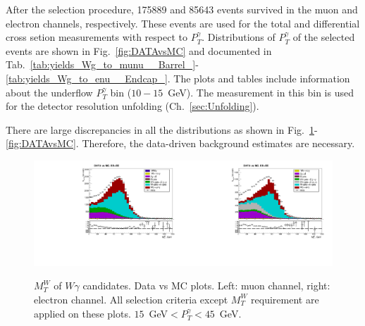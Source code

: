 
After the selection procedure, 175889 and 85643 events survived in the muon and electron channels, respectively. These events are used for the total and differential cross setion measurements with respect to $P_T^{\gamma}$. Distributions of $P_T^{\gamma}$ of the selected events are shown in Fig.~\ref{fig:DATAvsMC} and documented in Tab.~\ref{tab:yields_Wg_to_munu__Barrel_}-\ref{tab:yields_Wg_to_enu__Endcap_}. The plots and tables include information about the underflow $P_T^{\gamma}$ bin ($10-15$~GeV). The measurement in this bin is used for the detector resolution unfolding (Ch.~\ref{sec:Unfolding}). 

There are large discrepancies in all the distributions as shown in Fig.~\ref{fig:DATAvsMC_WMt}-\ref{fig:DATAvsMC}. Therefore, the data-driven background estimates are necessary.

\begin{figure}[htb]
  \begin{center}
   \includegraphics[width=0.5\textwidth]{../figs/figs_v11/MUON_WGamma/PrepareYields/c_TotalDATAvsMC_EtaCommon__WMtVERY_PRELIMINARY.pdf}\includegraphics[width=0.5\textwidth]{../figs/figs_v11/ELECTRON_WGamma/PrepareYields/c_TotalDATAvsMC_EtaCommon__WMtVERY_PRELIMINARY.pdf}
  \caption{ $M_T^W$ of $W\gamma$ candidates. Data vs MC plots. Left: muon channel, right: electron channel. All selection criteria except $M_{T}^W$ requirement are applied on these plots. $15$~GeV$<P_T^{\gamma}<45$~GeV. }
  \label{fig:DATAvsMC_WMt}
  \end{center}
\end{figure}

